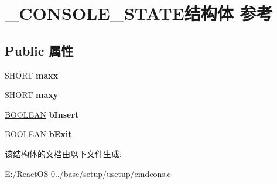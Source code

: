 \hypertarget{struct___c_o_n_s_o_l_e___s_t_a_t_e}{}\section{\+\_\+\+C\+O\+N\+S\+O\+L\+E\+\_\+\+S\+T\+A\+T\+E结构体 参考}
\label{struct___c_o_n_s_o_l_e___s_t_a_t_e}
\subsection*{Public 属性}
\begin{DoxyCompactItemize}
\item 
\mbox{\label{struct___c_o_n_s_o_l_e___s_t_a_t_e_a5f040ee1507f9f1ca04b3cb65da973f6}} 
S\+H\+O\+RT {\bfseries maxx}
\item 
\mbox{\label{struct___c_o_n_s_o_l_e___s_t_a_t_e_ad2efe57496c85c29e404c36b238be6e4}} 
S\+H\+O\+RT {\bfseries maxy}
\item 
\mbox{\label{struct___c_o_n_s_o_l_e___s_t_a_t_e_ac1fe4f82d350a7236b6e8209e5e7c519}} 
\hyperlink{_processor_bind_8h_a112e3146cb38b6ee95e64d85842e380a}{B\+O\+O\+L\+E\+AN} {\bfseries b\+Insert}
\item 
\mbox{\label{struct___c_o_n_s_o_l_e___s_t_a_t_e_a36b9a1f8d73dcac519f18f5d3090904e}} 
\hyperlink{_processor_bind_8h_a112e3146cb38b6ee95e64d85842e380a}{B\+O\+O\+L\+E\+AN} {\bfseries b\+Exit}
\end{DoxyCompactItemize}


该结构体的文档由以下文件生成\+:\begin{DoxyCompactItemize}
\item 
E\+:/\+React\+O\+S-\/0../base/setup/usetup/cmdcons.\+c\end{DoxyCompactItemize}
